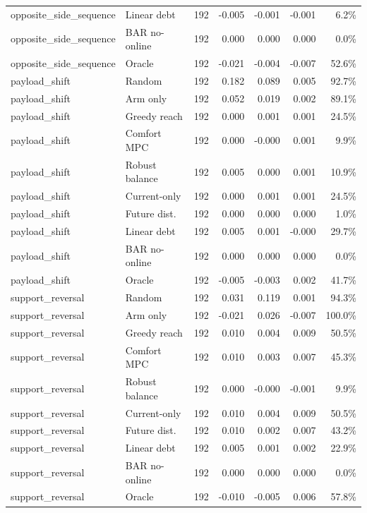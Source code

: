 \begin{longtable}{llrrrrr}
opposite\_side\_sequence & Linear debt & 192 & -0.005 & -0.001 & -0.001 & 6.2\% \\
opposite\_side\_sequence & BAR no-online & 192 & 0.000 & 0.000 & 0.000 & 0.0\% \\
opposite\_side\_sequence & Oracle & 192 & -0.021 & -0.004 & -0.007 & 52.6\% \\
payload\_shift & Random & 192 & 0.182 & 0.089 & 0.005 & 92.7\% \\
payload\_shift & Arm only & 192 & 0.052 & 0.019 & 0.002 & 89.1\% \\
payload\_shift & Greedy reach & 192 & 0.000 & 0.001 & 0.001 & 24.5\% \\
payload\_shift & Comfort MPC & 192 & 0.000 & -0.000 & 0.001 & 9.9\% \\
payload\_shift & Robust balance & 192 & 0.005 & 0.000 & 0.001 & 10.9\% \\
payload\_shift & Current-only & 192 & 0.000 & 0.001 & 0.001 & 24.5\% \\
payload\_shift & Future dist. & 192 & 0.000 & 0.000 & 0.000 & 1.0\% \\
payload\_shift & Linear debt & 192 & 0.005 & 0.001 & -0.000 & 29.7\% \\
payload\_shift & BAR no-online & 192 & 0.000 & 0.000 & 0.000 & 0.0\% \\
payload\_shift & Oracle & 192 & -0.005 & -0.003 & 0.002 & 41.7\% \\
support\_reversal & Random & 192 & 0.031 & 0.119 & 0.001 & 94.3\% \\
support\_reversal & Arm only & 192 & -0.021 & 0.026 & -0.007 & 100.0\% \\
support\_reversal & Greedy reach & 192 & 0.010 & 0.004 & 0.009 & 50.5\% \\
support\_reversal & Comfort MPC & 192 & 0.010 & 0.003 & 0.007 & 45.3\% \\
support\_reversal & Robust balance & 192 & 0.000 & -0.000 & -0.001 & 9.9\% \\
support\_reversal & Current-only & 192 & 0.010 & 0.004 & 0.009 & 50.5\% \\
support\_reversal & Future dist. & 192 & 0.010 & 0.002 & 0.007 & 43.2\% \\
support\_reversal & Linear debt & 192 & 0.005 & 0.001 & 0.002 & 22.9\% \\
support\_reversal & BAR no-online & 192 & 0.000 & 0.000 & 0.000 & 0.0\% \\
support\_reversal & Oracle & 192 & -0.010 & -0.005 & 0.006 & 57.8\% \\

\end{longtable}
